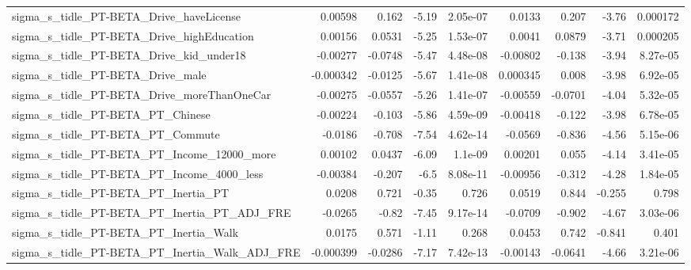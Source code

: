 \begin{tabular}{lrrrrrrrr}
sigma\_s\_tidle\_PT-BETA\_Drive\_haveLicense            &     0.00598 &        0.162 &    -5.19 & 2.05e-07 &     0.0133 &       0.207 &        -3.76 &      0.000172 \\
sigma\_s\_tidle\_PT-BETA\_Drive\_highEducation          &     0.00156 &       0.0531 &    -5.25 & 1.53e-07 &     0.0041 &      0.0879 &        -3.71 &      0.000205 \\
sigma\_s\_tidle\_PT-BETA\_Drive\_kid\_under18            &    -0.00277 &      -0.0748 &    -5.47 & 4.48e-08 &   -0.00802 &      -0.138 &        -3.94 &      8.27e-05 \\
sigma\_s\_tidle\_PT-BETA\_Drive\_male                   &   -0.000342 &      -0.0125 &    -5.67 & 1.41e-08 &   0.000345 &       0.008 &        -3.98 &      6.92e-05 \\
sigma\_s\_tidle\_PT-BETA\_Drive\_moreThanOneCar         &    -0.00275 &      -0.0557 &    -5.26 & 1.41e-07 &   -0.00559 &     -0.0701 &        -4.04 &      5.32e-05 \\
sigma\_s\_tidle\_PT-BETA\_PT\_Chinese                   &    -0.00224 &       -0.103 &    -5.86 & 4.59e-09 &   -0.00418 &      -0.122 &        -3.98 &      6.78e-05 \\
sigma\_s\_tidle\_PT-BETA\_PT\_Commute                   &     -0.0186 &       -0.708 &    -7.54 & 4.62e-14 &    -0.0569 &      -0.836 &        -4.56 &      5.15e-06 \\
sigma\_s\_tidle\_PT-BETA\_PT\_Income\_12000\_more         &     0.00102 &       0.0437 &    -6.09 &  1.1e-09 &    0.00201 &       0.055 &        -4.14 &      3.41e-05 \\
sigma\_s\_tidle\_PT-BETA\_PT\_Income\_4000\_less          &    -0.00384 &       -0.207 &     -6.5 & 8.08e-11 &   -0.00956 &      -0.312 &        -4.28 &      1.84e-05 \\
sigma\_s\_tidle\_PT-BETA\_PT\_Inertia\_PT                &      0.0208 &        0.721 &    -0.35 &    0.726 &     0.0519 &       0.844 &       -0.255 &         0.798 \\
sigma\_s\_tidle\_PT-BETA\_PT\_Inertia\_PT\_ADJ\_FRE        &     -0.0265 &        -0.82 &    -7.45 & 9.17e-14 &    -0.0709 &      -0.902 &        -4.67 &      3.03e-06 \\
sigma\_s\_tidle\_PT-BETA\_PT\_Inertia\_Walk              &      0.0175 &        0.571 &    -1.11 &    0.268 &     0.0453 &       0.742 &       -0.841 &         0.401 \\
sigma\_s\_tidle\_PT-BETA\_PT\_Inertia\_Walk\_ADJ\_FRE      &   -0.000399 &      -0.0286 &    -7.17 & 7.42e-13 &   -0.00143 &     -0.0641 &        -4.66 &      3.21e-06 \\

\end{tabular}
